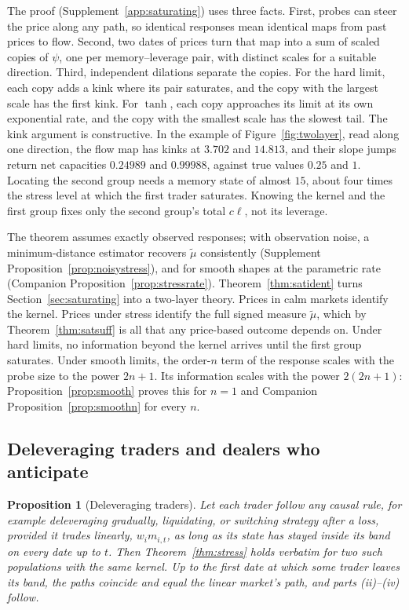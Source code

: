 \documentclass[12pt]{article}
\newtheorem{proposition}[theorem]{Proposition}
\theoremstyle{definition}
\theoremstyle{remark}
\begin{document}
The proof (Supplement~\ref{app:saturating}) uses three facts. First, probes can steer the price along any path, so identical responses mean identical maps from past prices to flow. Second, two dates of prices turn that map into a sum of scaled copies of $\psi$, one per memory--leverage pair, with distinct scales for a suitable direction. Third, independent dilations separate the copies. For the hard limit, each copy adds a kink where its pair saturates, and the copy with the largest scale has the first kink. For $\tanh$, each copy approaches its limit at its own exponential rate, and the copy with the smallest scale has the slowest tail. The kink argument is constructive. In the example of Figure~\ref{fig:twolayer}, read along one direction, the flow map has kinks at $3.702$ and $14.813$, and their slope jumps return net capacities $0.24989$ and $0.99988$, against true values $0.25$ and $1$. Locating the second group needs a memory state of almost $15$, about four times the stress level at which the first trader saturates. Knowing the kernel and the first group fixes only the second group's total $c\ell$, not its leverage.

The theorem assumes exactly observed responses; with observation noise, a minimum-distance estimator recovers $\tilde\mu$ consistently (Supplement Proposition~\ref{prop:noisystress}), and for smooth shapes at the parametric rate (Companion Proposition~\ref{prop:stressrate}). Theorem~\ref{thm:satident} turns Section~\ref{sec:saturating} into a two-layer theory. Prices in calm markets identify the kernel. Prices under stress identify the full signed measure $\tilde\mu$, which by Theorem~\ref{thm:satsuff} is all that any price-based outcome depends on. Under hard limits, no information beyond the kernel arrives until the first group saturates. Under smooth limits, the order-$n$ term of the response scales with the probe size to the power $2n+1$. Its information scales with the power $2(2n+1)$: Proposition~\ref{prop:smooth} proves this for $n=1$ and Companion Proposition~\ref{prop:smoothn} for every $n$.

\subsection{Deleveraging traders and dealers who anticipate}

\begin{proposition}[Deleveraging traders]\label{prop:delever}
Let each trader follow any causal rule, for example deleveraging gradually, liquidating, or switching strategy after a loss, provided it trades linearly, $w_im_{i,t}$, as long as its state has stayed inside its band on every date up to $t$. Then Theorem~\ref{thm:stress} holds verbatim for two such populations with the same kernel. Up to the first date at which some trader leaves its band, the paths coincide and equal the linear market's path, and parts (ii)--(iv) follow.
\end{proposition}
\end{document}
